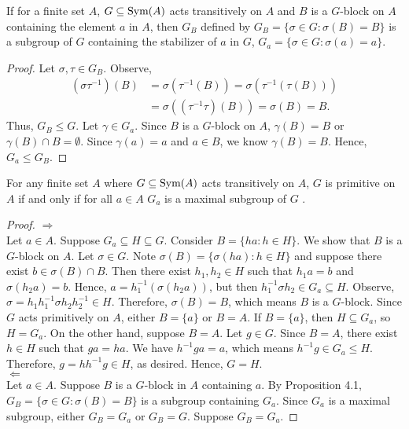 \begin{proposition}
    If for a finite set $A$, $G\subseteq\text{Sym}(A)$ acts transitively on $A$ and $B$ is a $G$-block on $A$ containing the element $a$ in $A$, then $G_B$ defined by $G_{B}=\{\sigma\in G:\sigma(B)=B\}$ is a subgroup of $G$ containing the stabilizer of $a$ in $G$, $G_a=\{\sigma\in G:\sigma(a)=a\}$.\cite[117]{dummit2004abstract}
\end{proposition}
\begin{proof}
Let $\sigma,\tau\in G_B$. Observe,
\begin{align*}
    (\sigma\tau^{-1})(B)&=\sigma(\tau^{-1}(B))=\sigma(\tau^{-1}(\tau(B)))\\
    &=\sigma((\tau^{-1}\tau)(B))=\sigma(B)=B.
\end{align*}
Thus, $G_B\le G$. Let $\gamma\in G_a$. Since $B$ is a $G$-block on $A$, $\gamma(B)=B$ or $\gamma(B)\cap B=\emptyset$. Since $\gamma(a)=a$ and $a\in B$, we know $\gamma(B)=B$. Hence, $G_a\le G_B$.
\end{proof}
\begin{proposition}\label{prop:prop42}
    For any finite set $A$ where $G\subseteq\text{Sym}(A)$ acts transitively on $A$, $G$ is primitive on $A$ if and only if for all $a\in A$ $G_a$ is a maximal subgroup of $G$ \cite[117]{dummit2004abstract}.  
\end{proposition}
\begin{proof}
    $\Rightarrow$\\Let $a\in A$. Suppose $G_a\subseteq H\subseteq G$. Consider $B=\{ha:h\in H\}$. We show that $B$ is a $G$-block on $A$. Let $\sigma\in G$. Note $\sigma(B)=\{\sigma(ha):h\in H\}$ and suppose there exist $b\in \sigma(B)\cap B$. Then there exist $h_1,h_2\in H$ such that $h_1a=b$ and $\sigma(h_2a)=b$. Hence, $a=h_1^{-1}(\sigma(h_2a))$, but then $h_1^{-1}\sigma h_2\in G_a\subseteq H$. Observe, $\sigma=h_1h_1^{-1}\sigma h_2h_2^{-1}\in H$. Therefore, $\sigma(B)=B$, which means $B$ is a $G$-block. Since $G$ acts primitively on $A$, either $B=\{a\}$ or $B=A$. If $B=\{a\}$, then $H\subseteq G_a$, so $H=G_a$. On the other hand, suppose $B=A$. Let $g\in G$. Since $B=A$, there exist $h\in H$ such that $ga=ha$. We have $h^{-1}ga=a$, which means $h^{-1}g\in G_a\le H$. Therefore, $g=hh^{-1}g\in H$, as desired. Hence,  $G=H$.\\
    $\Leftarrow$\\
    Let $a\in A$. Suppose $B$ is a $G$-block in $A$ containing $a$. By Proposition 4.1, $G_B=\{\sigma\in G:\sigma(B)=B\}$ is a subgroup containing $G_a$. Since $G_a$ is a maximal subgroup, either $G_B=G_a$ or $G_B=G$. Suppose $G_B=G_a$.
\end{proof}
